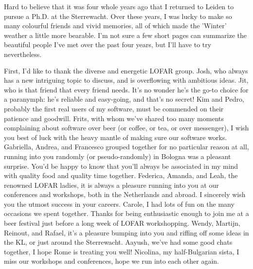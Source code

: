 \cleardoublepage
{}
{}
\begin{thesisacknowledgements}


    \newcommand{\bees}[1]{\texttt{[image: coloremoji.sty/emoji\_images/hires/\#1.pdf]}}

Hard to believe that it was four whole years ago that I returned to Leiden to pursue a Ph.D. at the Sterrewacht. Over these years, I was lucky to make so many colourful friends and vivid memories, all of which made the 'Winter' weather a little more bearable. I'm not sure a few short pages can summarize the beautiful people I've met over the past four years, but I'll have to try nevertheless.

    First, I'd like to thank the diverse and energetic LOFAR group. Josh, who always has a new intriguing topic to discuss, and is overflowing with ambitious ideas. Jit, who is that friend that every friend needs. It's no wonder he's the go-to choice for a paranymph: he's reliable and easy-going, and that's no secret! Kim and Pedro, probably the first real users of my software, must be commended on their patience and goodwill. Frits, with whom we've shared too many moments complaining about software over beer (or coffee, or tea, or over messenger), I wish you best of luck with the heavy mantle of making sure our software works. Gabriella, Andrea, and Francesco grouped together for no particular reason at all, running into you randomly (or pseudo-randomly) in Bologna was a pleasant surprise. You'd be happy to know that you'll always be associated in my mind with quality food and quality time together. Federica, Amanda, and Leah, the renowned LOFAR ladies, it is always a pleasure running into you at our conferences and workshops, both in the Netherlands and abroad. I sincerely wish you the utmost success in your careers. Carole, I had lots of fun on the many occasions we spent together. Thanks for being enthusiastic enough to join me at a beer festival just before a long week of LOFAR workshopping. Wendy, Martijn, Reinout, and Rafael, it's a pleasure bumping into you and riffing off some ideas in the KL, or just around the Sterrewacht. Aayush, we've had some good chats together, I hope Rome is treating you well! Nicolina, my half-Bulgarian sista, I miss our workshops and conferences, hope we run into each other again. 


\end{thesisacknowledgements}
